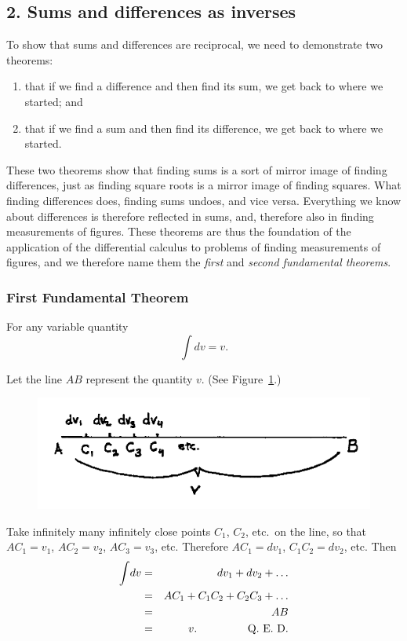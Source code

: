 \documentclass[polutonikogreek,english,twoside,openright]{article}
\begin{document}
\subsection*{2. Sums and differences as inverses}

To show that sums and differences are reciprocal, we need to demonstrate two theorems:
\begin{enumerate}
\item that if we find a difference and then find its sum, we get back
  to where we started; and
\item that if we find a sum and then find its difference, we get back
  to where we started.
\end{enumerate}
These two theorems show that finding sums is a sort of mirror image of
finding differences, just as finding square roots is a mirror image of
finding squares.  What finding differences does, finding sums undoes,
and vice versa.  Everything we know about differences is therefore
reflected in sums, and, therefore also in finding measurements of
figures.  These theorems are thus the foundation of the application of
the differential calculus to problems of finding measurements of
figures, and we therefore name them the {\em first} and {\em second
  fundamental theorems}.

\subsubsection*{First Fundamental Theorem}
\label{fund1} For any variable quantity
$$\int\!dv = v.$$

Let the line $AB$ represent the quantity $v$. (See Figure~\ref{ffundfig}.)
\begin{figure}[htp]
\begin{center}
\includegraphics[width=.75\textwidth]{fig/Figure37}
\caption{}
\label{ffundfig}
\vspace{-10pt}
\end{center}
\end{figure} Take infinitely many infinitely close points $C_1$,
$C_2$, etc.\ on the line, so that $AC_1 = v_1$, $AC_2 =v_2$,
$AC_3 =v_3$, etc.  Therefore $AC_1 =dv_1$, $C_1C_2 = dv_2$, etc. Then
\begin{eqnarray*}
  \int\!dv & = & dv_1 + dv_2 + \ldots\\
           & = & AC_1 + C_1C_2 + C_2C_3 +\ldots \\
           & = & AB\\
           & = & v. \mbox{\hspace{10ex} Q. E. D.}
\end{eqnarray*}
\end{document}
